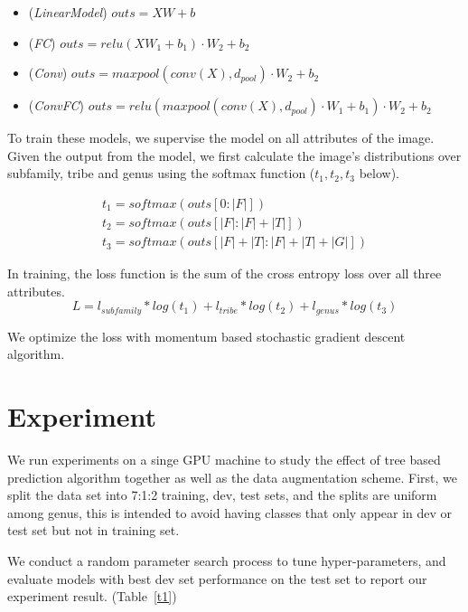 \documentclass{article}
\begin{document}
\begin{itemize}
	\item (\emph{LinearModel}) $\mathit{outs} = {X} {W} + {b}$
	\item (\emph{FC}) $\mathit{outs} = \mathit{relu}({X} {W}_1 + b_1)\cdot W_2 + b_2$
	\item (\emph{Conv}) $\mathit{outs} = \mathit{maxpool}(\mathit{conv}({X}), d_{\mathit{pool}})\cdot W_2 + b_2$
	\item (\emph{ConvFC}) $\mathit{outs} = \mathit{relu}(\mathit{maxpool}(\mathit{conv}({X}), d_{\mathit{pool}})\cdot W_1 + b_1)\cdot W_2 + b_2$

\end{itemize}

To train these models, we supervise the model on all attributes of the image. Given the output from the model, we first calculate the image's distributions over subfamily, tribe and genus using the softmax function ($t_1, t_2, t_3$ below).

\[
\begin{array}{l}
t_1 = \mathit{softmax}(\mathit{outs}[0:|F|])\\
t_2 = \mathit{softmax}(\mathit{outs}[|F|: |F| + |T|])\\
t_3 = \mathit{softmax}(\mathit{outs}[|F| + |T|:|F| + |T| + |G|])
\end{array}
\]

In training, the loss function is the sum of the cross entropy loss over all three attributes. 
$$L = l_{\mathit{subfamily}} * log(t_1) + l_{\mathit{tribe}} * log(t_2) +  l_{\mathit{genus}} * log(t_3)$$

We optimize the loss with momentum based stochastic gradient descent algorithm.


\section{Experiment}

We run experiments on a singe GPU machine to study the effect of tree based prediction algorithm together as well as the data augmentation scheme. First, we split the data set into 7:1:2 training, dev, test sets, and the splits are uniform among genus, this is intended to avoid having classes that only appear in dev or test set but not in training set.

We conduct a random parameter search process to tune hyper-parameters, and evaluate models with best dev set performance on the test set to report our experiment result. (Table~\ref{t1}) 
\end{document}
